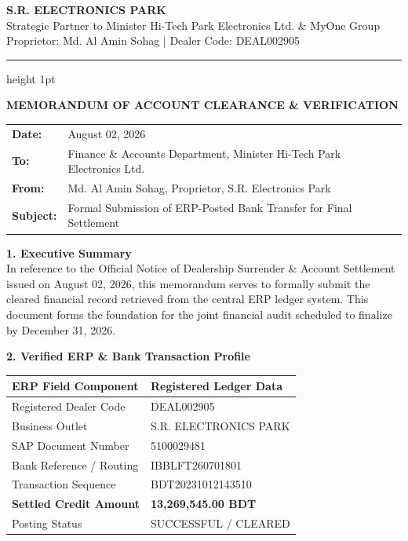 \documentclass[11pt, a4paper]{article}
\begin{document}
\pagestyle{empty}

\begin{center}
    {\color{primary}\huge \textbf{S.R. ELECTRONICS PARK}}\\[4pt]
    {\color{accent}\small Strategic Partner to Minister Hi-Tech Park Electronics Ltd. \& MyOne Group}\\[2pt]
    {\footnotesize Proprietor: Md. Al Amin Sohag | Dealer Code: DEAL002905}
\end{center}

\vspace{10pt}
\hrule height 1pt
\vspace{15pt}

{\color{primary}\Large \textbf{MEMORANDUM OF ACCOUNT CLEARANCE \& VERIFICATION}}\\[12pt]

\begin{tabular}{@{}l p{12cm}@{}}
    \textbf{Date:} & August 02, 2026 \\
    \textbf{To:} & Finance \& Accounts Department, Minister Hi-Tech Park Electronics Ltd. \\
    \textbf{From:} & Md. Al Amin Sohag, Proprietor, S.R. Electronics Park \\
    \textbf{Subject:} & Formal Submission of ERP-Posted Bank Transfer for Final Settlement
\end{tabular}

\vspace{15pt}

\textbf{1. Executive Summary}\\[4pt]
In reference to the Official Notice of Dealership Surrender \& Account Settlement issued on August 02, 2026, this memorandum serves to formally submit the cleared financial record retrieved from the central ERP ledger system. This document forms the foundation for the joint financial audit scheduled to finalize by December 31, 2026.

\vspace{10pt}

\textbf{2. Verified ERP \& Bank Transaction Profile}\\[6pt]
\begin{center}
\begin{tabular}{ll}
    \toprule
    \textbf{ERP Field Component} & \textbf{Registered Ledger Data} \\
    \midrule
    Registered Dealer Code & DEAL002905 \\
    Business Outlet & S.R. ELECTRONICS PARK \\
    SAP Document Number & 5100029481 \\
    Bank Reference / Routing & IBBLFT260701801 \\
    Transaction Sequence & BDT20231012143510 \\
    \textbf{Settled Credit Amount} & \textbf{13,269,545.00 BDT} \\
    Posting Status & SUCCESSFUL / CLEARED \\
    \bottomrule
\end{tabular}
\end{center}
\end{document}
